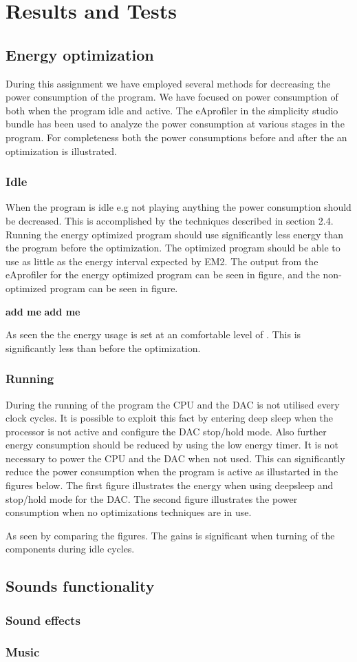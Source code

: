 \section{Results and Tests}

\subsection{Energy optimization}
During this assignment we have employed several methods for decreasing the power consumption of the program. We have focused on power consumption of both when the program idle and active. The eAprofiler in the simplicity studio bundle has been used to analyze the power consumption at various stages in the program. For completeness both the power consumptions before and after the an optimization is illustrated.


\subsubsection{Idle}
When the program is idle e.g not playing anything the power consumption should be decreased. This is accomplished by the techniques described in section 2.4. Running the energy optimized program should use significantly less energy than the program before the optimization. The optimized program should be able to use as little as the energy interval expected by EM2. The output from the eAprofiler for the energy optimized program can be seen in figure, and the non-optimized program can be seen in figure.

{\bf add me}
{\bf add me}

As seen the the energy usage is set at an comfortable level of  . This is significantly less than before the optimization. 




\subsubsection{Running}
During the running of the program the CPU and the DAC is not utilised every clock cycles. It is possible to exploit this fact by entering deep sleep when the processor is not active and configure the DAC stop/hold mode. Also further energy consumption should be reduced by using the low energy timer. It is not necessary to power the CPU and the DAC when not used. This can significantly reduce the power consumption when the program is active as illustarted in the figures below. The first figure illustrates the energy when using deepsleep and stop/hold mode for the DAC. The second figure illustrates the power consumption when no optimizations techniques are in use.  


As seen by comparing the figures. The gains is significant when turning of the components during idle cycles. 


\subsection{Sounds functionality}


\subsubsection{Sound effects}


\subsubsection{Music}


